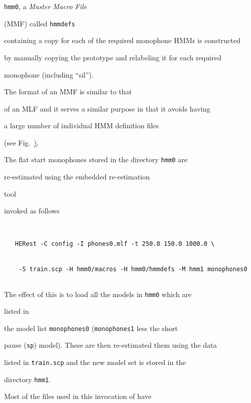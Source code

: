 \texttt{hmm0}, a \textit{Master Macro File} 


(MMF) called \texttt{hmmdefs} 


containing a copy for each of the required monophone HMMs is constructed 


by manually copying the prototype and relabeling it for each required 


monophone (including ``sil'').  


The format of an MMF is similar to that


of an MLF and it serves a similar purpose in that it avoids having


a large number of individual HMM definition files 


(see Fig.~\href{f:MMFeg}).










The flat start monophones stored in the directory \texttt{hmm0} are


re-estimated using the embedded re-estimation 


tool 


invoked as follows


\begin{verbatim}


   HERest -C config -I phones0.mlf -t 250.0 150.0 1000.0 \


    -S train.scp -H hmm0/macros -H hmm0/hmmdefs -M hmm1 monophones0


\end{verbatim}


The effect of this is to load all the models in \texttt{hmm0} which are


listed in


the model list \texttt{monophones0} (\texttt{monophones1} less the short 


pause (\texttt{sp}) model). These are then re-estimated them using the data


listed in \texttt{train.scp} and the new model set is stored in the


directory \texttt{hmm1}.


Most of the files used in this invocation of  have 


